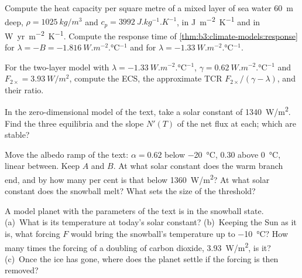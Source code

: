 \begin{exercise}[$\star$]\label{exo:b3:climate-models:3}
Compute the heat capacity per square metre of a mixed layer of sea water
\qty{60}{m} deep, $\rho = \qty{1025}{kg/m^3}$ and $c_p = \qty{3992}{J.kg^{-1}.K^{-1}}$,
in \unit{J.m^{-2}.K^{-1}} and in \unit{W.yr.m^{-2}.K^{-1}}. Compute the
response time of \cref{thm:b3:climate-models:response} for $\lambda = -B =
\qty{-1.816}{W.m^{-2}.\celsius^{-1}}$ and for $\lambda =
\qty{-1.33}{W.m^{-2}.\celsius^{-1}}$.
\end{exercise}

\begin{exercise}[$\star$]\label{exo:b3:climate-models:4}
For the two-layer model with $\lambda = \qty{-1.33}{W.m^{-2}.\celsius^{-1}}$,
$\gamma = \qty{0.62}{W.m^{-2}.\celsius^{-1}}$ and $F_{2\times} =
\qty{3.93}{W/m^2}$, compute the ECS, the approximate TCR $F_{2\times}/
(\gamma - \lambda)$, and their ratio.
\end{exercise}

\begin{exercise}[$\star\star$]\label{exo:b3:climate-models:5}
In the zero-dimensional model of the text, take a solar constant of
\qty{1340}{W/m^2}. Find the three equilibria and the slope $N'(T)$ of the
net flux at each; which are stable?
\end{exercise}

\begin{exercise}[$\star\star$]\label{exo:b3:climate-models:6}
Move the albedo ramp of the text: $\alpha = 0.62$ below \qty{-20}{\celsius},
$0.30$ above \qty{0}{\celsius}, linear between. Keep $A$ and $B$. At what
solar constant does the warm branch end, and by how many per cent is that
below \qty{1360}{W/m^2}? At what solar constant does the snowball melt?
What sets the size of the threshold?
\end{exercise}

\begin{exercise}[$\star\star$]\label{exo:b3:climate-models:7}
A model planet with the parameters of the text is in the snowball state.
(a)~What is its temperature at today's solar constant? (b)~Keeping the Sun
as it is, what forcing $F$ would bring the snowball's temperature up to
\qty{-10}{\celsius}? How many times the forcing of a doubling of carbon
dioxide, \qty{3.93}{W/m^2}, is it? (c)~Once the ice has gone, where does
the planet settle if the forcing is then removed?
\end{exercise}

